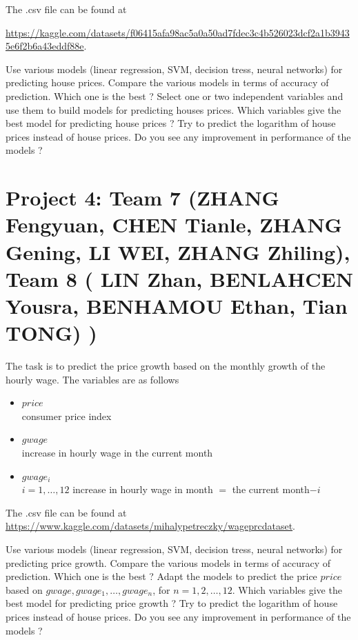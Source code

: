 \documentclass{article}
\begin{document}
   The .csv file can be found at  

   \url{https://kaggle.com/datasets/f06415afa98ac5a0a50ad7fdec3c4b526023dcf2a1b39435e6f2b6a43eddf88e}.
    
     Use various models (linear regression, SVM, decision tress, neural networks) for predicting house prices. Compare the various models in terms of accuracy of prediction. Which one is the best ? 
 Select one or two independent variables  and use them to build models for predicting houses prices. Which variables give the best 
 model for predicting  house prices  ?  Try to predict the logarithm of house prices instead of house prices. Do you see any improvement in performance of the models ?

   

\section*{Project 4: Team 7 (ZHANG Fengyuan, CHEN Tianle, ZHANG	Gening, LI WEI,
ZHANG	Zhiling), Team 8 ( LIN	Zhan, BENLAHCEN	Yousra, BENHAMOU Ethan, Tian TONG)
)}

  The task is to predict the price growth based on the monthly growth of the hourly wage. The variables are as follows
   \begin{itemize}
   \item{$price$ \\}                   consumer price index
   \item{$gwage$ \\}                    increase in hourly wage in the current month
   \item{$gwage_i$ \\} $i=1,\ldots,12$   increase in hourly wage in month $=$ the current month$- i$
  \end{itemize}

   The .csv file can be found at 
   \url{https://www.kaggle.com/datasets/mihalypetreczky/wageprcdataset}. 


    Use various models (linear regression, SVM, decision tress, neural networks) for predicting price growth. Compare the various models in terms of accuracy of prediction. Which one is the best ? 
     Adapt the models to predict the price $price$ based on $gwage,gwage_1,\ldots,gwage_n$, for $n=1,2,\ldots,12$. Which variables give the best model for predicting  price growth ?  Try to predict the logarithm of house prices instead of house prices. Do you see any improvement in performance of the models ?
\end{document}
